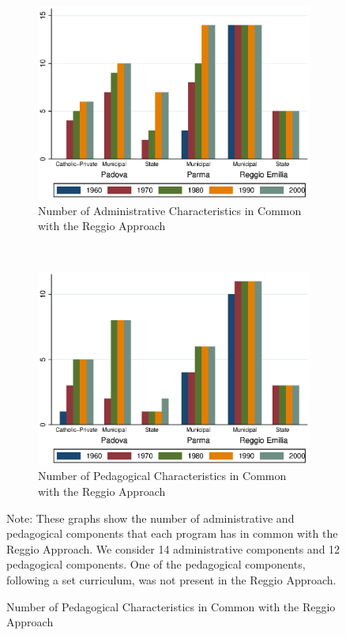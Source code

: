 \begin{figure}[H]
\begin{center}
\begin{subfigure}[b]{0.55\textwidth}
	\caption{Number of Administrative Characteristics in Common with the Reggio Approach}\label{fig:agg-admin}
	\includegraphics[width=\textwidth]{../../output/aggregateAdministrative.eps}
\end{subfigure}%
~
\begin{subfigure}[b]{0.55\textwidth}
	\caption{Number of Pedagogical Characteristics in Common with the Reggio Approach}\label{fig:agg-ped}
	\includegraphics[width=\textwidth]{../../output/aggregatePedagogical.eps}
\end{subfigure}%
\end{center}
\raggedright \footnotesize Note: These graphs show the number of administrative and pedagogical components that each program has in common with the Reggio Approach. We consider 14 administrative components and 12 pedagogical components. One of the pedagogical components, following a set curriculum, was not present in the Reggio Approach. 
\end{figure}

